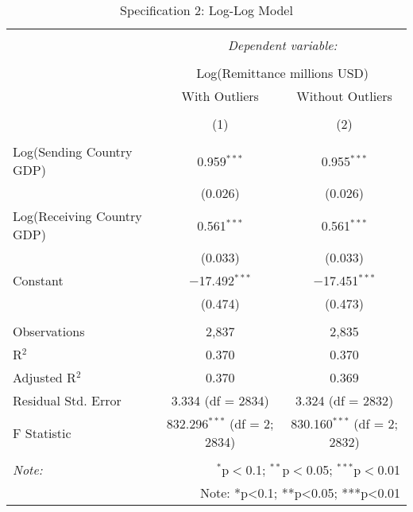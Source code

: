 
\begin{table}[!htbp] \centering 
  \caption{Specification 2: Log-Log Model} 
  \label{} 
\begin{tabular}{@{\extracolsep{5pt}}lcc} 
\\[-1.8ex]\hline 
\hline \\[-1.8ex] 
 & \multicolumn{2}{c}{\textit{Dependent variable:}} \\ 
\cline{2-3} 
\\[-1.8ex] & \multicolumn{2}{c}{Log(Remittance millions USD)} \\ 
 & With Outliers & Without Outliers \\ 
\\[-1.8ex] & (1) & (2)\\ 
\hline \\[-1.8ex] 
 Log(Sending Country GDP) & 0.959$^{***}$ & 0.955$^{***}$ \\ 
  & (0.026) & (0.026) \\ 
  Log(Receiving Country GDP) & 0.561$^{***}$ & 0.561$^{***}$ \\ 
  & (0.033) & (0.033) \\ 
  Constant & $-$17.492$^{***}$ & $-$17.451$^{***}$ \\ 
  & (0.474) & (0.473) \\ 
 \hline \\[-1.8ex] 
Observations & 2,837 & 2,835 \\ 
R$^{2}$ & 0.370 & 0.370 \\ 
Adjusted R$^{2}$ & 0.370 & 0.369 \\ 
Residual Std. Error & 3.334 (df = 2834) & 3.324 (df = 2832) \\ 
F Statistic & 832.296$^{***}$ (df = 2; 2834) & 830.160$^{***}$ (df = 2; 2832) \\ 
\hline 
\hline \\[-1.8ex] 
\textit{Note:}  & \multicolumn{2}{r}{$^{*}$p$<$0.1; $^{**}$p$<$0.05; $^{***}$p$<$0.01} \\ 
 & \multicolumn{2}{r}{Note: *p<0.1; **p<0.05; ***p<0.01} \\ 
\end{tabular} 
\end{table} 
